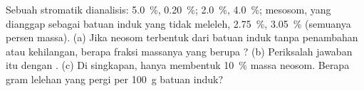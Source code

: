 \begin{exercise}[$\star\star\star$]\label{exo:b2:crustal-melting:12}
Sebuah  stromatik dianalisis:   \qty{5.0}{\percent}, 
\qty{0.20}{\percent};   \qty{2.0}{\percent}, 
\qty{4.0}{\percent}; mesosom, yang dianggap sebagai batuan induk yang tidak meleleh, 
\qty{2.75}{\percent},  \qty{3.05}{\percent} (semuanya persen massa). (a) Jika
neosom terbentuk dari batuan induk tanpa penambahan atau kehilangan, berapa fraksi massanya yang berupa
? (b) Periksalah jawaban itu dengan . (c) Di singkapan,  hanya membentuk
\qty{10}{\percent} massa neosom. Berapa gram lelehan yang pergi per
\qty{100}{\gram} batuan induk?
\end{exercise}

